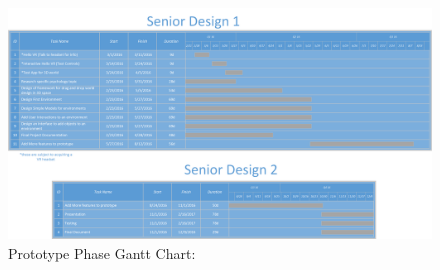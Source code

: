 \documentclass[a4paper,10pt]{article}
\begin{document}
	\begin{figure}[ht!]
	\includegraphics[width=\linewidth]{scheduleSR.png}
	\caption{Prototype Phase Gantt Chart:}
	\label{fig:pchart}
	\end{figure}
	\pagebreak
	
	
	
	
	
\end{document}

